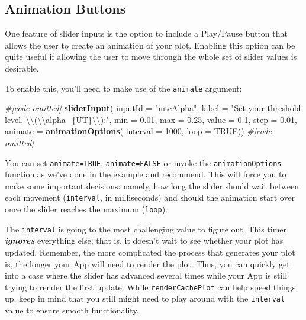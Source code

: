 \documentclass[
]{book}
\newenvironment{Shaded}{\begin{snugshade}}{\end{snugshade}}
\newcommand{\CharTok}[1]{\textcolor[rgb]{0.31,0.60,0.02}{#1}}
\newcommand{\CommentTok}[1]{\textcolor[rgb]{0.56,0.35,0.01}{\textit{#1}}}
\newcommand{\DataTypeTok}[1]{\textcolor[rgb]{0.13,0.29,0.53}{#1}}
\newcommand{\DecValTok}[1]{\textcolor[rgb]{0.00,0.00,0.81}{#1}}
\newcommand{\FloatTok}[1]{\textcolor[rgb]{0.00,0.00,0.81}{#1}}
\newcommand{\KeywordTok}[1]{\textcolor[rgb]{0.13,0.29,0.53}{\textbf{#1}}}
\newcommand{\NormalTok}[1]{#1}
\newcommand{\OtherTok}[1]{\textcolor[rgb]{0.56,0.35,0.01}{#1}}
\newcommand{\StringTok}[1]{\textcolor[rgb]{0.31,0.60,0.02}{#1}}
\begin{document}
\hypertarget{animation-buttons}{%
\subsection{Animation Buttons}\label{animation-buttons}}

One feature of slider inputs is the option to include a Play/Pause button that allows the user to create an animation of your plot. Enabling this option can be quite useful if allowing the user to move through the whole set of slider values is desirable.

To enable this, you'll need to make use of the \texttt{animate} argument:

\begin{Shaded}
\begin{Highlighting}[]
\CommentTok{#[code omitted]}
\KeywordTok{sliderInput}\NormalTok{(}
  \DataTypeTok{inputId =} \StringTok{"mtcAlpha"}\NormalTok{,}
  \DataTypeTok{label =} \StringTok{"Set your threshold level, }\CharTok{\textbackslash{}\textbackslash{}}\StringTok{(}\CharTok{\textbackslash{}\textbackslash{}}\StringTok{alpha_\{UT\}}\CharTok{\textbackslash{}\textbackslash{}}\StringTok{):"}\NormalTok{,}
  \DataTypeTok{min =} \FloatTok{0.01}\NormalTok{,}
  \DataTypeTok{max =} \FloatTok{0.25}\NormalTok{,}
  \DataTypeTok{value =} \FloatTok{0.1}\NormalTok{,}
  \DataTypeTok{step =} \FloatTok{0.01}\NormalTok{,}
  \DataTypeTok{animate =} \KeywordTok{animationOptions}\NormalTok{(}
    \DataTypeTok{interval =} \DecValTok{1000}\NormalTok{, }\DataTypeTok{loop =} \OtherTok{TRUE}\NormalTok{))}
\CommentTok{#[code omitted]}
\end{Highlighting}
\end{Shaded}

You can set \texttt{animate=TRUE}, \texttt{animate=FALSE} or invoke the \texttt{animationOptions} function as we've done in the example and recommend. This will force you to make some important decisions: namely, how long the slider should wait between each movement (\texttt{interval}, in milliseconds) and should the animation start over once the slider reaches the maximum (\texttt{loop}).

The \texttt{interval} is going to the most challenging value to figure out. This timer \emph{\textbf{ignores}} everything else; that is, it doesn't wait to see whether your plot has updated. Remember, the more complicated the process that generates your plot is, the longer your App will need to render the plot. Thus, you can quickly get into a case where the slider has advanced several times while your App is still trying to render the first update. While \texttt{renderCachePlot} can help speed things up, keep in mind that you still might need to play around with the \texttt{interval} value to ensure smooth functionality.
\end{document}
